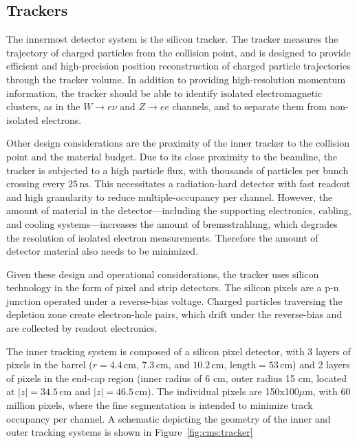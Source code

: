 \subsection{Trackers}\label{ch:cms:tracker}
The innermost detector system is the silicon tracker. The tracker measures the trajectory of charged particles from the collision point, and is designed to provide efficient and high-precision position reconstruction of charged particle trajectories through the tracker volume. In addition to providing high-resolution momentum information, the tracker should be able to identify isolated electromagnetic clusters, as in the $W\rightarrow e\nu$ and $Z \rightarrow ee$ channels, and to separate them from non-isolated electrons\cite{Karimaki:368412}.

Other design considerations are the proximity of the inner tracker to the collision point and the material budget. Due to its close proximity to the beamline, the tracker is subjected to a high particle flux, with thousands of particles per bunch crossing every $25\,\mathrm{ns}$. This necessitates a radiation-hard detector with fast readout and high granularity to reduce multiple-occupancy per channel. However, the amount of material in the detector---including the supporting electronics, cabling, and cooling systems---increases the amount of bremsstrahlung, which degrades the resolution of isolated electron measurements. Therefore the amount of detector material also needs to be minimized.

Given these design and operational considerations, the tracker uses silicon technology in the form of pixel and strip detectors. The silicon pixels are a p-n junction operated under a reverse-bias voltage. Charged particles traversing the depletion zone create electron-hole pairs, which drift under the reverse-bias and are collected by readout electronics.

The inner tracking system is composed of a silicon pixel detector, with 3 layers of pixels in the barrel ($r=4.4 \,\mathrm{cm}$, $7.3 \,\mathrm{cm}$, and $10.2 \,\mathrm{cm}$, $\mathrm{length}=53\,\mathrm{cm}$) and 2 layers of pixels in the end-cap region (inner radius of 6 cm, outer radius 15 cm, located at $|z|=34.5 \,\mathrm{cm}$ and $|z|= 46.5 \,\mathrm{cm}$). The individual pixels are 150x100$\mu\mathrm{m}$, with 60 million pixels, where the fine segmentation is intended to minimize track occupancy per channel. A schematic depicting the geometry of the inner and outer tracking systems is shown in Figure~\ref{fig:cms:tracker}

